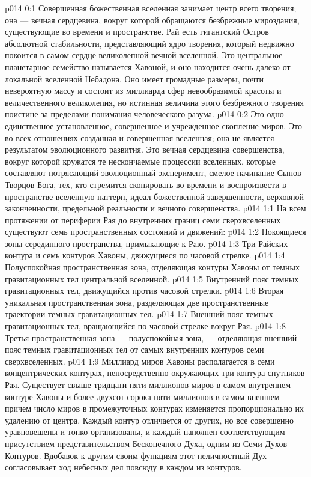 \author{Совершенствователь Мудрости}
\vs p014 0:1 Совершенная божественная вселенная занимает центр всего творения; она --- вечная сердцевина, вокруг которой обращаются безбрежные мироздания, существующие во времени и пространстве. Рай есть гигантский Остров абсолютной стабильности, представляющий ядро творения, который недвижно покоится в самом сердце великолепной вечной вселенной. Это центральное планетарное семейство называется Хавоной, и оно находится очень далеко от локальной вселенной Небадона. Оно имеет громадные размеры, почти невероятную массу и состоит из миллиарда сфер невообразимой красоты и величественного великолепия, но истинная величина этого безбрежного творения поистине за пределами понимания человеческого разума.
\vs p014 0:2 Это одно\hyp{}единственное установленное, совершенное и учрежденное скопление миров. Это во всех отношениях созданная и совершенная вселенная; она не является результатом эволюционного развития. Это вечная сердцевина совершенства, вокруг которой кружатся те нескончаемые процессии вселенных, которые составляют потрясающий эволюционный эксперимент, смелое начинание Сынов\hyp{}Творцов Бога, тех, кто стремится скопировать во времени и воспроизвести в пространстве вселенную\hyp{}паттерн, идеал божественной завершенности, верховной законченности, предельной реальности и вечного совершенства.
\vs p014 1:1 На всем протяжении от периферии Рая до внутренних границ семи сверхвселенных существуют семь пространственных состояний и движений:
\vs p014 1:2 \bibnobreakspace Покоящиеся зоны серединного пространства, примыкающие к Раю.
\vs p014 1:3 \bibnobreakspace Три Райских контура и семь контуров Хавоны, движущиеся по часовой стрелке.
\vs p014 1:4 \bibnobreakspace Полуспокойная пространственная зона, отделяющая контуры Хавоны от темных гравитационных тел центральной вселенной.
\vs p014 1:5 \bibnobreakspace Внутренний пояс темных гравитационных тел, движущийся против часовой стрелки.
\vs p014 1:6 \bibnobreakspace Вторая уникальная пространственная зона, разделяющая две пространственные траектории темных гравитационных тел.
\vs p014 1:7 \bibnobreakspace Внешний пояс темных гравитационных тел, вращающийся по часовой стрелке вокруг Рая.
\vs p014 1:8 \bibnobreakspace Третья пространственная зона --- полуспокойная зона, --- отделяющая внешний пояс темных гравитационных тел от самых внутренних контуров семи сверхвселенных.
\vs p014 1:9 \pc Миллиард миров Хавоны располагается в семи концентрических контурах, непосредственно окружающих три контура спутников Рая. Существует свыше тридцати пяти миллионов миров в самом внутреннем контуре Хавоны и более двухсот сорока пяти миллионов в самом внешнем --- причем число миров в промежуточных контурах изменяется пропорционально их удалению от центра. Каждый контур отличается от других, но все совершенно уравновешены и тонко организованы, и каждый наполнен соответствующим присутствием\hyp{}представительством Бесконечного Духа, одним из Семи Духов Контуров. Вдобавок к другим своим функциям этот неличностный Дух согласовывает ход небесных дел повсюду в каждом из контуров.
